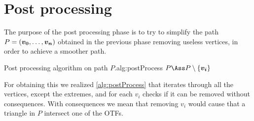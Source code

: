 \documentclass[dissertation.tex]{subfiles}
\begin{document}
\section{Post processing}\label{sec:postPro}
The purpose of the post processing phase is to try to simplify the
path $P=(\boldsymbol{v_0},\dots,\boldsymbol{v_n})$ obtained in the previous phase
removing useless vertices, in order
to achieve a smoother path.

\begin{algo}{Post processing algorithm on path $P$.}{alg:postProcess}
  \State $P\Ass P\setminus\{\ve{v_i}\}$
  \EndIf
  \EndIf
  \EndFor
  \EndProcedure
\end{algo}
For obtaining this we realized \cref{alg:postProcess} that
iterates through all the vertices, except the extremes, and for each
$v_i$ checks if it can be removed without consequences. With
consequences we mean that removing $v_i$ would cause that a triangle
in $P$ intersect one of the \acp{OTF}.
\end{document}
